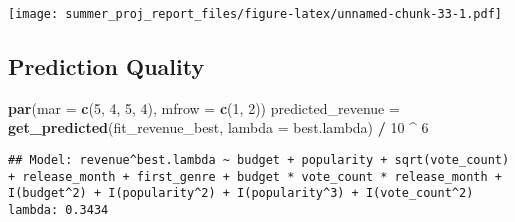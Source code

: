 \documentclass[
]{article}
\newenvironment{Shaded}{\begin{snugshade}}{\end{snugshade}}
\newcommand{\DataTypeTok}[1]{\textcolor[rgb]{0.13,0.29,0.53}{#1}}
\newcommand{\DecValTok}[1]{\textcolor[rgb]{0.00,0.00,0.81}{#1}}
\newcommand{\KeywordTok}[1]{\textcolor[rgb]{0.13,0.29,0.53}{\textbf{#1}}}
\newcommand{\NormalTok}[1]{#1}
\newcommand{\OperatorTok}[1]{\textcolor[rgb]{0.81,0.36,0.00}{\textbf{#1}}}
\newcommand{\StringTok}[1]{\textcolor[rgb]{0.31,0.60,0.02}{#1}}
\begin{document}
\texttt{[image: summer\_proj\_report\_files/figure-latex/unnamed-chunk-33-1.pdf]}

\hypertarget{prediction-quality}{%
\subsection{Prediction Quality}\label{prediction-quality}}

\begin{Shaded}
\begin{Highlighting}[]
\KeywordTok{par}\NormalTok{(}\DataTypeTok{mar =} \KeywordTok{c}\NormalTok{(}\DecValTok{5}\NormalTok{, }\DecValTok{4}\NormalTok{, }\DecValTok{5}\NormalTok{, }\DecValTok{4}\NormalTok{), }\DataTypeTok{mfrow =} \KeywordTok{c}\NormalTok{(}\DecValTok{1}\NormalTok{, }\DecValTok{2}\NormalTok{))}
\NormalTok{predicted_revenue =}\StringTok{ }\KeywordTok{get_predicted}\NormalTok{(fit_revenue_best, }\DataTypeTok{lambda =}\NormalTok{ best.lambda) }\OperatorTok{/}\StringTok{ }\DecValTok{10} \OperatorTok{^}\StringTok{ }\DecValTok{6}
\end{Highlighting}
\end{Shaded}

\begin{verbatim}
## Model: revenue^best.lambda ~ budget + popularity + sqrt(vote_count) + release_month + first_genre + budget * vote_count * release_month + I(budget^2) + I(popularity^2) + I(popularity^3) + I(vote_count^2) lambda: 0.3434
\end{verbatim}
\end{document}
